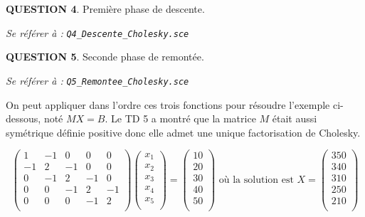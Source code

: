 \documentclass[a4paper,11pt]{article}
\newcommand{\quest}[1]{\small\textbf{#1}\normalsize}
\theoremstyle{nonumberplain}
\theoremstyle{nonumberplain}
\theoremstyle{nonumberplain}
\begin{document}
    \bigskip
    \quest{QUESTION 4}. Première phase de descente.
    \begin{ref_scilab}
        \emph{Se référer à :} \texttt{\emph{Q4\_Descente\_Cholesky.sce}}
    \end{ref_scilab}

    \bigskip
    \quest{QUESTION 5}. Seconde phase de remontée.
    \begin{ref_scilab}
        \emph{Se référer à :} \texttt{\emph{Q5\_Remontee\_Cholesky.sce}}
    \end{ref_scilab}

    On peut appliquer dans l'ordre ces trois fonctions pour résoudre l'exemple ci-dessous, noté $MX = B$.
    Le TD 5 a montré que la matrice $M$ était aussi symétrique définie positive
    donc elle admet une unique factorisation de Cholesky.

      \[
      \begin{pmatrix}
          1   &   -1    &   0     &   0     &   0   \\
          -1  &   2     &   -1    &   0     &   0   \\
          0   &   -1    &   2     &   -1    &   0   \\
          0   &   0     &   -1    &   2     &   -1  \\
          0   &   0     &   0     &   -1    &   2   \\
      \end{pmatrix}
      \begin{pmatrix}
          x_1 \\
          x_2 \\
          x_3 \\
          x_4 \\
          x_5 \\
      \end{pmatrix}
      =
      \begin{pmatrix}
          10 \\
          20 \\
          30 \\
          40 \\
          50 \\
      \end{pmatrix}
      \text{ où la solution est }
      X =
      \begin{pmatrix}
          350 \\
          340 \\
          310 \\
          250 \\
          210 \\
      \end{pmatrix}
      \]
\end{document}

